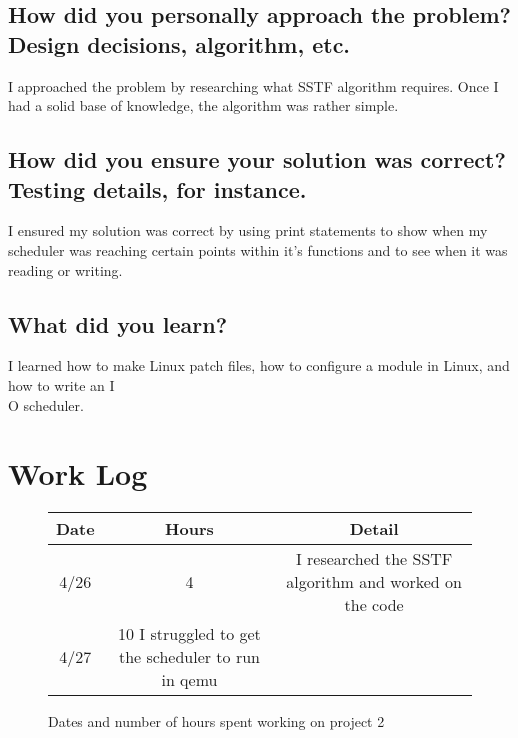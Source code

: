 \documentclass[journal,letterpaper,draftclsnofoot,onecolumn,10pt]{IEEEtran}
\begin{document}
\subsection{How did you personally approach the problem? Design decisions, algorithm, etc.}
I approached the problem by researching what SSTF algorithm requires. Once I had a solid base of knowledge, the algorithm was rather simple.
\subsection{How did you ensure your solution was correct? Testing details, for instance.}
I ensured my solution was correct by using print statements to show when my scheduler was reaching certain points within it's functions and to see when it was reading or writing.
\subsection{What did you learn?}
I learned how to make Linux patch files, how to configure a module in Linux, and how to write an I\\O scheduler.

\section{Work Log}

\begin{figure}[h]
   \begin{tabular}{c | c | c}
      Date & Hours & Detail\\
      \hline
      4/26 & 4 & I researched the SSTF algorithm and worked on the code\\
      \hline
      4/27 & 10 I struggled to get the scheduler to run in qemu\\
      \hline
   \end{tabular}
   \caption{Dates and number of hours spent working on project 2}
\end{figure}
      
\end{document}
